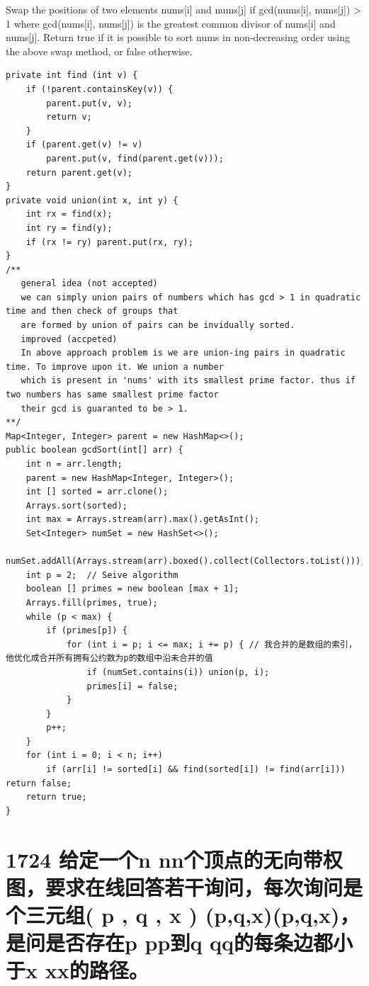 \documentclass[9pt, b5paaper]{book}
\begin{document}
Swap the positions of two elements nums[i] and nums[j] if gcd(nums[i], nums[j]) > 1 where gcd(nums[i], nums[j]) is the greatest common divisor of nums[i] and nums[j].
Return true if it is possible to sort nums in non-decreasing order using the above swap method, or false otherwise.
\begin{verbatim}
private int find (int v) {
    if (!parent.containsKey(v)) {
        parent.put(v, v);
        return v;
    }
    if (parent.get(v) != v)
        parent.put(v, find(parent.get(v)));
    return parent.get(v);
}
private void union(int x, int y) {
    int rx = find(x);
    int ry = find(y);
    if (rx != ry) parent.put(rx, ry);
}
/**
   general idea (not accepted)
   we can simply union pairs of numbers which has gcd > 1 in quadratic time and then check of groups that
   are formed by union of pairs can be invidually sorted. 
   improved (accpeted)
   In above approach problem is we are union-ing pairs in quadratic time. To improve upon it. We union a number
   which is present in 'nums' with its smallest prime factor. thus if two numbers has same smallest prime factor
   their gcd is guaranted to be > 1. 
**/
Map<Integer, Integer> parent = new HashMap<>();
public boolean gcdSort(int[] arr) {
    int n = arr.length;
    parent = new HashMap<Integer, Integer>();
    int [] sorted = arr.clone();
    Arrays.sort(sorted);
    int max = Arrays.stream(arr).max().getAsInt();
    Set<Integer> numSet = new HashSet<>();
    numSet.addAll(Arrays.stream(arr).boxed().collect(Collectors.toList()));
    int p = 2;  // Seive algorithm
    boolean [] primes = new boolean [max + 1];
    Arrays.fill(primes, true);
    while (p < max) {
        if (primes[p]) {
            for (int i = p; i <= max; i += p) { // 我合并的是数组的索引，他优化成合并所有拥有公约数为p的数组中沿未合并的值
                if (numSet.contains(i)) union(p, i);
                primes[i] = false;
            }
        }
        p++;
    }
    for (int i = 0; i < n; i++) 
        if (arr[i] != sorted[i] && find(sorted[i]) != find(arr[i])) return false;
    return true;
}
\end{verbatim}

\section{1724 给定一个n nn个顶点的无向带权图，要求在线回答若干询问，每次询问是个三元组( p , q , x ) (p,q,x)(p,q,x)，是问是否存在p pp到q qq的每条边都小于x xx的路径。}
\label{sec-6-7}
\end{document}
